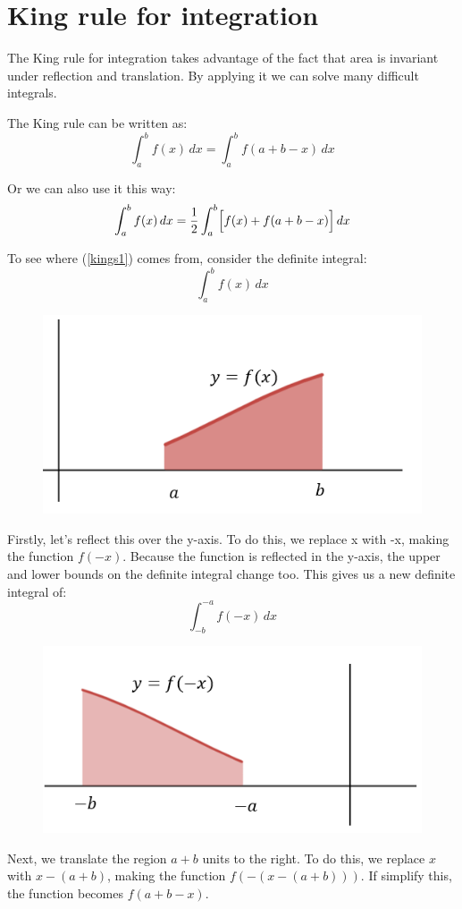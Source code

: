 \documentclass[../main.tex]{subfiles}
\begin{document}
\section{King rule for integration}
The King rule for integration takes advantage of the fact that area is invariant under reflection and translation. By applying it we can solve many difficult integrals.

The King rule can be written as:
\begin{equation}\label{kings1}
    \int_{a}^{b} f(x)\,dx = \int_{a}^{b} f(a+b-x)\, dx
\end{equation}

Or we can also use it this way:
\begin{equation}\label{kings2}
    \int_{a}^{b} f(x)\,dx = \frac{1}{2}\int_{a}^{b} \Bigl[f(x) + f(a+b-x)\Bigl]\, dx
\end{equation}

To see where (\ref{kings1}) comes from, consider the definite integral:
\[\int_{a}^{b} f(x)\,dx\]

\begin{figure}[h]
    \centering
    \includegraphics[width=0.4\linewidth]{images/kingsrule1.png}
\end{figure}

Firstly, let's reflect this over the y-axis. To do this, we replace {x} with {-x}, making the function $f(-x)$. Because the function is reflected in the y-axis, the upper and lower bounds on the definite integral change too. This gives us a new definite integral of:
\[\int_{-b}^{-a} f(-x)\,dx\]

\begin{figure}[h]
    \centering
    \includegraphics[width=0.4\linewidth]{images/kingsrule2.png}
\end{figure}

Next, we translate the region $a+b$ units to the right. To do this, we replace $x$ with $x-(a+b)$, making the function $f(-(x-(a+b)))$. If simplify this, the function becomes $f(a+b-x)$.
\end{document}
